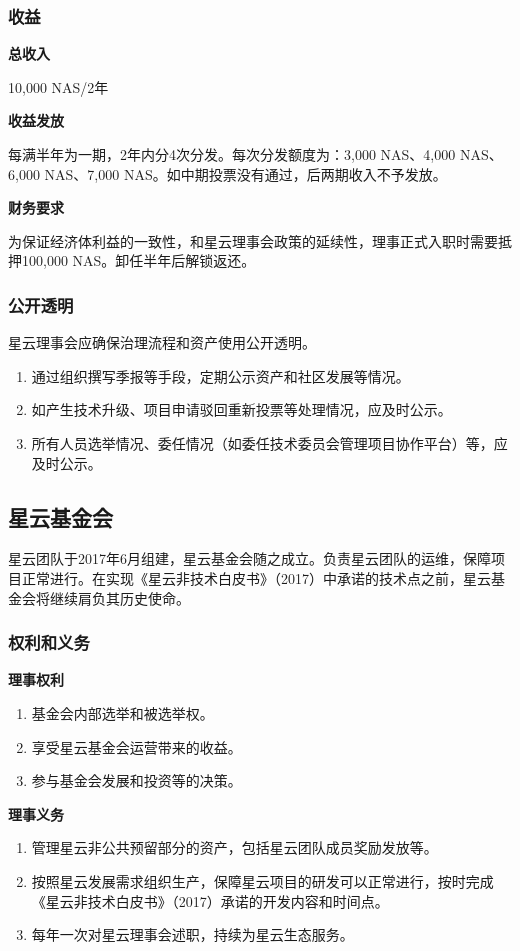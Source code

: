 \subsubsection{收益}
\textbf{总收入}

10,000 NAS/2年

\textbf{收益发放}

每满半年为一期，2年内分4次分发。每次分发额度为：3,000 NAS、4,000 NAS、6,000 NAS、7,000 NAS。如中期投票没有通过，后两期收入不予发放。

\textbf{财务要求}

为保证经济体利益的一致性，和星云理事会政策的延续性，理事正式入职时需要抵押100,000 NAS。卸任半年后解锁返还。

\subsubsection{公开透明}
星云理事会应确保治理流程和资产使用公开透明。
\begin{enumerate}
	\item 通过组织撰写季报等手段，定期公示资产和社区发展等情况。
	\item 如产生技术升级、项目申请驳回重新投票等处理情况，应及时公示。
	\item 所有人员选举情况、委任情况（如委任技术委员会管理项目协作平台）等，应及时公示。
\end{enumerate}

\subsection{星云基金会}
星云团队于2017年6月组建，星云基金会随之成立。负责星云团队的运维，保障项目正常进行。在实现《星云非技术白皮书》（2017）中承诺的技术点之前，星云基金会将继续肩负其历史使命。
\subsubsection{权利和义务}
\textbf{理事权利}
\begin{enumerate}
	\item 基金会内部选举和被选举权。
	\item 享受星云基金会运营带来的收益。
	\item 参与基金会发展和投资等的决策。
\end{enumerate}
\textbf{理事义务}
\begin{enumerate}
	\item 管理星云非公共预留部分的资产，包括星云团队成员奖励发放等。
	\item 按照星云发展需求组织生产，保障星云项目的研发可以正常进行，按时完成《星云非技术白皮书》（2017）承诺的开发内容和时间点。
	\item 每年一次对星云理事会述职，持续为星云生态服务。
\end{enumerate}
